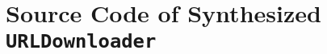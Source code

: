 


\section{Source Code of Synthesized \texttt{URLDownloader}}
\label{sec:SynthesizedURLDownload}

\inputminted[fontsize=\scriptsize,linenos,breaklines]{java}{../src/ttc15-tranj/src/main/java/ttc15/tranj/examples/SynthesizedURLDownload.java}
